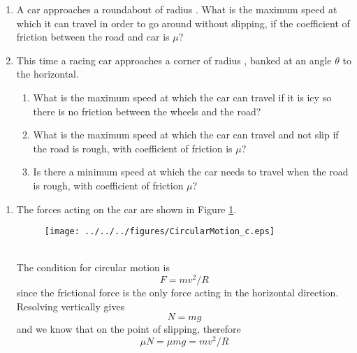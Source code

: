 

\begin{problem}
{
\begin{enumerate}
\item A car approaches a roundabout of radius . What is the maximum speed at which it can travel in order to go around without slipping, if the coefficient of friction between the road and car is $\mu$?
\item This time a racing car approaches a corner of radius , banked at an angle $\theta$ to the horizontal. 
\begin{enumerate}
\item What is the maximum speed at which the car can travel if it is icy so there is no friction between the wheels and the road?
\item What is the maximum speed at which the car can travel and not slip if the road is rough, with coefficient of friction is $\mu$?
\item Is there a minimum speed at which the car needs to travel when the road is rough, with coefficient of friction $\mu$?\end{enumerate} \end{enumerate}}
{}
{\begin{enumerate}
\item The forces acting on the car are shown in Figure \ref{fig:CircularMotion_c}.
\begin{figure}[h]
\centering
\texttt{[image: ../../../figures/CircularMotion\_c.eps]}
\caption{}
\label{fig:CircularMotion_c}
\end{figure}
\\
The condition for circular motion is
\begin{equation*}
F=mv^2/R
\end{equation*}
since the frictional force  is the only force acting in the horizontal direction. Resolving vertically gives
\begin{equation*}
N=mg
\end{equation*}
and we know that \value{F}{\mu N}{} on the point of slipping, therefore
\begin{equation*}
\mu N=\mu mg=mv^2/R
\end{equation*}

\end{enumerate}}
\end{problem}
